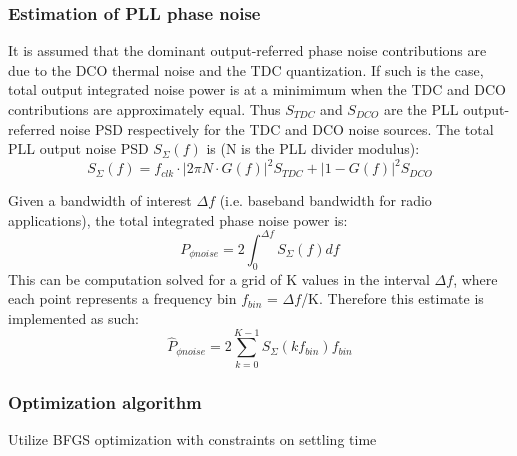 \subsubsection{Estimation of PLL phase noise}
	It is assumed that the dominant output-referred phase noise contributions are due to the DCO thermal noise and the TDC quantization. If such is the case, total output integrated noise power is at a minimimum when the TDC and DCO contributions are approximately equal. Thus $S_{TDC}$ and $S_{DCO}$ are the PLL output-referred noise PSD respectively for the TDC and DCO noise sources. The total PLL output noise PSD $S_{\Sigma}(f)$ is (N is the PLL divider modulus):
	\begin{equation}
		S_{\Sigma}(f) = f_{clk}\cdot|2\pi N\cdot G(f)|^2S_{TDC} + |1-G(f)|^2S_{DCO}
	\end{equation}

	Given a bandwidth of interest $\Delta f$ (i.e. baseband bandwidth for radio applications), the total integrated phase noise power is:
	\begin{equation}
		P_{\phi noise} = 2\int_0^{\Delta f} S_{\Sigma}(f)df
	\end{equation}
	This can be computation solved for a grid of K values in the interval $\Delta f$, where each point represents a frequency bin $f_{bin}$ = $\Delta f$/K. Therefore this estimate is implemented as such:
	\begin{equation}
		\hat{P}_{\phi noise} = 2\sum_{k=0}^{K-1} S_{\Sigma}(kf_{bin})f_{bin}
	\end{equation}

\subsubsection{Optimization algorithm}
	Utilize BFGS optimization with constraints on settling time
